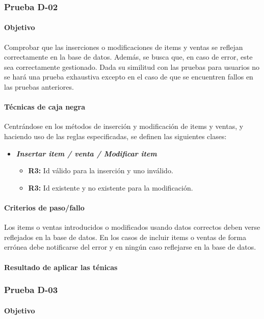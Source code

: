\documentclass[10pt,a4paper]{article}
\begin{document}
			\subsubsection{Prueba D-02}
			\paragraph{Objetivo} Comprobar que las inserciones o modificaciones de items y ventas se reflejan correctamente en la base de datos.
			Además, se busca que, en caso de error, este sea correctamente gestionado.
			Dada su similitud con las pruebas para usuarios no se hará una prueba exhaustiva excepto en el caso de que se encuentren fallos en las pruebas anteriores.
			\paragraph{Técnicas de caja negra} Centrándose en los métodos de inserción y modificación de items y ventas, y haciendo uso de las reglas especificadas, se definen las siguientes clases:
			\begin{itemize}
				\item \textbf{\textit{Insertar item / venta / Modificar item}}
					\begin{itemize}
						\item \textbf{R3:} Id válido para la inserción y uno inválido.
						\item \textbf{R3:} Id existente y no existente para la modificación.
					\end{itemize}
			\end{itemize}
			\paragraph{Criterios de paso/fallo} Los items o ventas introducidos o modificados usando datos correctos deben verse reflejados en la base de datos.
			En los casos de incluir items o ventas de forma errónea debe notificarse del error y en ningún caso reflejarse en la base de datos.
			\paragraph{Resultado de aplicar las ténicas}
			\subsubsection{Prueba D-03}
			\paragraph{Objetivo}
\end{document}
